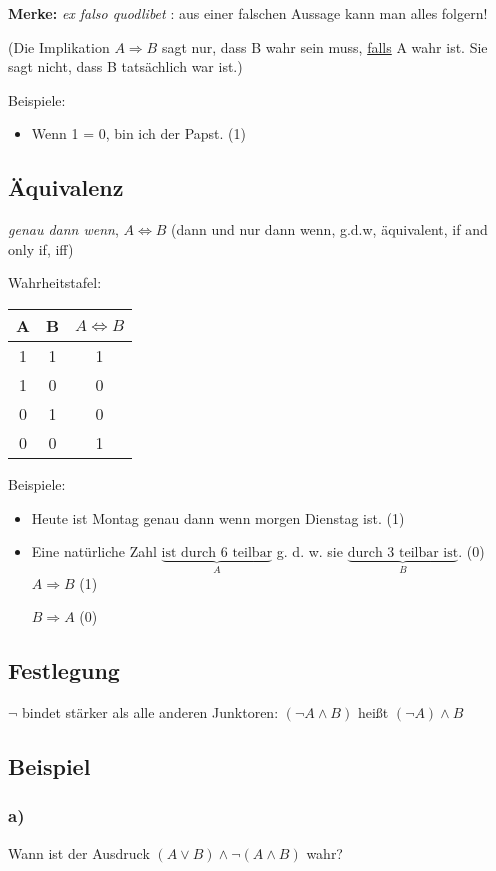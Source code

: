 \documentclass[a4paper, 12pt, twoside] {article}
\begin{document}
\textbf{Merke: } \textit{ex falso quodlibet} : aus einer falschen Aussage kann man alles folgern!

(Die Implikation $A \Rightarrow B$ sagt nur, dass B wahr sein muss, \underline{falls} A wahr ist. Sie sagt nicht, dass B tatsächlich war ist.)

Beispiele:
\begin{itemize}
\item Wenn 1 = 0, bin ich der Papst. (1)
\end{itemize}

\subsection{Äquivalenz} %
\textit{genau dann wenn}, $ A \Leftrightarrow B$ (dann und nur dann wenn, g.d.w, äquivalent, if and only if, iff)

Wahrheitstafel: \qquad
\begin{tabular}{| c c | c |}
\hline
A & B & $A \Leftrightarrow B$ \\
\hline
1 & 1 & 1 \\
1 & 0 & 0 \\
0 & 1 & 0 \\
0 & 0 & 1 \\
\hline
\end{tabular}

Beispiele:
\begin{itemize}
\item Heute ist Montag genau dann wenn morgen Dienstag ist. (1)
\item Eine natürliche Zahl $\underbrace{\text{ist durch 6 teilbar}}_{A}$ g. d. w. sie $\underbrace{\text{durch 3 teilbar ist}}_{B}$. (0) 
$A \Rightarrow B$ (1) 

$B \Rightarrow A$ (0)
\end{itemize}


\subsection*{Festlegung}
$\neg$ bindet stärker als alle anderen Junktoren: $(\neg A \wedge B)$ heißt $ (\neg A) \wedge B$

\subsection{Beispiel} %
\subsubsection*{a)}
Wann ist der Ausdruck $(A \lor B) \wedge \neg (A \wedge B)$ wahr?
\end{document}
